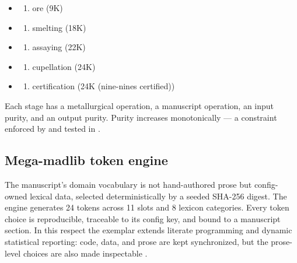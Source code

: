 \documentclass[
]{article}
\providecommand{\tightlist}{%
  \setlength{\itemsep}{0pt}\setlength{\parskip}{0pt}}
\begin{document}
\begin{itemize}
\tightlist
\item
  \begin{enumerate}
  \def\labelenumi{\arabic{enumi}.}
  \tightlist
  \item
    ore (9K)
  \end{enumerate}
\item
  \begin{enumerate}
  \def\labelenumi{\arabic{enumi}.}
  \setcounter{enumi}{1}
  \tightlist
  \item
    smelting (18K)
  \end{enumerate}
\item
  \begin{enumerate}
  \def\labelenumi{\arabic{enumi}.}
  \setcounter{enumi}{2}
  \tightlist
  \item
    assaying (22K)
  \end{enumerate}
\item
  \begin{enumerate}
  \def\labelenumi{\arabic{enumi}.}
  \setcounter{enumi}{3}
  \tightlist
  \item
    cupellation (24K)
  \end{enumerate}
\item
  \begin{enumerate}
  \def\labelenumi{\arabic{enumi}.}
  \setcounter{enumi}{4}
  \tightlist
  \item
    certification (24K (nine-nines certified))
  \end{enumerate}
\end{itemize}

Each stage has a metallurgical operation, a manuscript operation, an
input purity, and an output purity. Purity increases monotonically --- a
constraint enforced by
 and tested in
.

\subsection{Mega-madlib token engine}\label{mega-madlib-token-engine}

The manuscript's domain vocabulary is not hand-authored prose but
config-owned lexical data, selected deterministically by a seeded
SHA-256 digest. The engine generates 24 tokens across 11 slots and 8
lexicon categories. Every token choice is reproducible, traceable to its
config key, and bound to a manuscript section. In this respect the
exemplar extends literate programming and dynamic statistical reporting:
code, data, and prose are kept synchronized, but the prose-level choices
are also made inspectable
\citep{knuth1984literate, leisch2002sweave, marwick2018packaging}.
\end{document}
